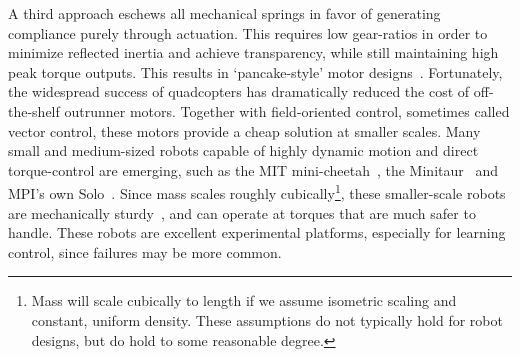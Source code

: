A third approach eschews all mechanical springs in favor of generating compliance purely through actuation. This requires low gear-ratios in order to minimize reflected inertia and achieve transparency, while still maintaining high peak torque outputs. This results in `pancake-style' motor designs~\cite{Seok2012proprioceptive}.
Fortunately, the widespread success of quadcopters has dramatically reduced the cost of off-the-shelf outrunner motors. Together with field-oriented control, sometimes called vector control, these motors provide a cheap solution at smaller scales. Many small and medium-sized robots capable of highly dynamic motion and direct torque-control are emerging, such as the MIT mini-cheetah~\cite{katz2019mini}, the Minitaur~\cite{kenneally2016design} and MPI's own Solo~\cite{grimminger2019open}. Since mass scales roughly cubically\footnote{Mass will scale cubically to length if we assume isometric scaling and constant, uniform density. These assumptions do not typically hold for robot designs, but do hold to some reasonable degree.}, these smaller-scale robots are mechanically sturdy~\cite{biewener2005biomechanical}, and can operate at torques that are much safer to handle. These robots are excellent experimental platforms, especially for learning control, since failures may be more common. \par





